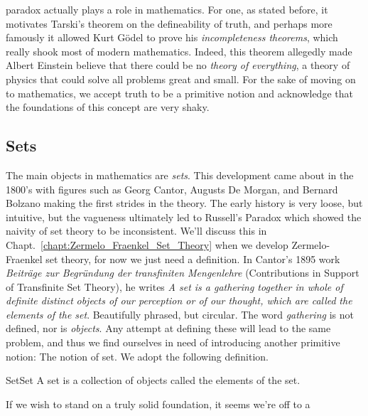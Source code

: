         paradox actually plays a role in mathematics. For one, as stated before,
        it motivates Tarski's theorem on the defineability of truth, and perhaps
        more famously it allowed Kurt G\"{o}del to prove
        his \textit{incompleteness theorems}, which really shook most of modern
        mathematics. Indeed, this theorem allegedly made Albert
        Einstein believe that there could be no
        \textit{theory of everything}, a theory of
        physics that could solve all problems great and small. For the sake of
        moving on to mathematics, we accept truth to be a primitive notion and
        acknowledge that the foundations of this concept are very shaky.
    \subsection{Sets}
        The main objects in mathematics are \textit{sets}. This development came
        about in the 1800's with figures such as Georg
        Cantor, Augusts De
        Morgan, and Bernard
        Bolzano making the first strides in the theory.
        The early history is very loose, but intuitive, but the vagueness
        ultimately led to Russell's Paradox which
        showed the naivity of set theory to be inconsistent. We'll discuss this
        in Chapt.~\ref{chapt:Zermelo_Fraenkel_Set_Theory} when we develop
        Zermelo-Fraenkel set theory, for now we just need a definition. In
        Cantor's 1895 work
        \textit{Beitr\"{a}ge zur Begr\"{u}ndung der transfiniten Mengenlehre}
        (Contributions in Support of Transfinite Set Theory), he writes
        \textit{A set is a gathering together in whole of definite distinct}
        \textit{objects of our perception or of our thought, which are called}
        \textit{the elements of the set}. Beautifully phrased, but circular. The
        word \textit{gathering} is not defined, nor is \textit{objects}. Any
        attempt at defining these will lead to the same problem, and thus we
        find ourselves in need of introducing another primitive notion: The
        notion of set. We adopt the following definition.
        \begin{fdefinition}{Set}{Set}
            A \gls{set} is a collection of objects called the elements of the
            set.
        \end{fdefinition}
        If we wish to stand on a truly solid foundation, it seems we're off to a
